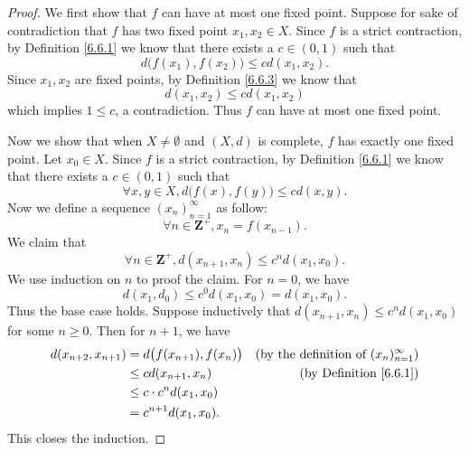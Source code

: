 \begin{proof}
    We first show that \(f\) can have at most one fixed point.
    Suppose for sake of contradiction that \(f\) has two fixed point \(x_1, x_2 \in X\).
    Since \(f\) is a strict contraction, by Definition \ref{6.6.1} we know that there exists a \(c \in (0, 1)\) such that
    \[
        d\big(f(x_1), f(x_2)\big) \leq c d(x_1, x_2).
    \]
    Since \(x_1, x_2\) are fixed points, by Definition \ref{6.6.3} we know that
    \[
        d(x_1, x_2) \leq c d(x_1, x_2)
    \]
    which implies \(1 \leq c\), a contradiction.
    Thus \(f\) can have at most one fixed point.

    Now we show that when \(X \neq \emptyset\) and \((X, d)\) is complete, \(f\) has exactly one fixed point.
    Let \(x_0 \in X\).
    Since \(f\) is a strict contraction, by Definition \ref{6.6.1} we know that there exists a \(c \in (0, 1)\) such that
    \[
        \forall x, y \in X, d\big(f(x), f(y)\big) \leq c d(x, y).
    \]
    Now we define a sequence \((x_n)_{n = 1}^\infty\) as follow:
    \[
        \forall n \in \mathbf{Z}^+, x_n = f(x_{n - 1}).
    \]
    We claim that
    \[
        \forall n \in \mathbf{Z}^+, d(x_{n + 1}, x_n) \leq c^n d(x_1, x_0).
    \]
    We use induction on \(n\) to proof the claim.
    For \(n = 0\), we have
    \[
        d(x_1, d_0) \leq c^0 d(x_1, x_0) = d(x_1, x_0).
    \]
    Thus the base case holds.
    Suppose inductively that \(d(x_{n + 1}, x_n) \leq c^n d(x_1, x_0)\) for some \(n \geq 0\).
    Then for \(n + 1\), we have
    \begin{align*}
        d(x_{n + 2}, x_{n + 1}) & = d\big(f(x_{n + 1}), f(x_n)\big) & \text{(by the definition of \((x_n)_{n = 1}^\infty\))} \\
                                & \leq c d(x_{n + 1}, x_n)          & \text{(by Definition \ref{6.6.1})}                     \\
                                & \leq c \cdot c^n d(x_1, x_0)                                                               \\
                                & = c^{n + 1} d(x_1, x_0).
    \end{align*}
    This closes the induction.


\end{proof}
